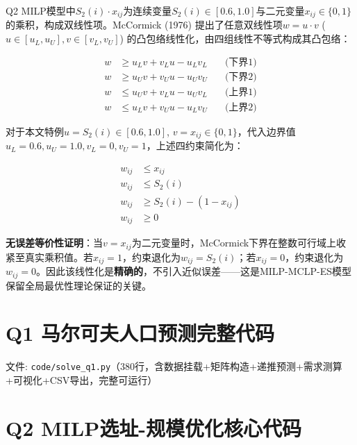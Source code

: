 Q2 MILP模型中$S_2(i)\cdot x_{ij}$为连续变量$S_2(i)\in[0.6,1.0]$与二元变量$x_{ij}\in\{0,1\}$的乘积，构成双线性项。McCormick (1976) 提出了任意双线性项$w = u\cdot v$ ($u\in[u_L,u_U], v\in[v_L,v_U]$) 的凸包络线性化，由四组线性不等式构成其凸包络：

\begin{equation}
\begin{aligned}
w &\ge u_L v + v_L u - u_L v_L \quad &\text{(下界1)} \\
w &\ge u_U v + v_U u - u_U v_U \quad &\text{(下界2)} \\
w &\le u_U v + v_L u - u_U v_L \quad &\text{(上界1)} \\
w &\le u_L v + v_U u - u_L v_U \quad &\text{(上界2)}
\end{aligned}
\end{equation}

对于本文特例$u=S_2(i)\in[0.6,1.0]$, $v=x_{ij}\in\{0,1\}$，代入边界值$u_L=0.6, u_U=1.0, v_L=0, v_U=1$，上述四约束简化为：

\begin{equation}
\boxed{
\begin{aligned}
w_{ij} &\le x_{ij} \\
w_{ij} &\le S_2(i) \\
w_{ij} &\ge S_2(i) - (1 - x_{ij}) \\
w_{ij} &\ge 0
\end{aligned}
}
\end{equation}

\textbf{无误差等价性证明}：当$v=x_{ij}$为二元变量时，McCormick下界在整数可行域上收紧至真实乘积值。若$x_{ij}=1$，约束退化为$w_{ij}=S_2(i)$；若$x_{ij}=0$，约束退化为$w_{ij}=0$。因此该线性化是\textbf{精确的}，不引入近似误差——这是MILP-MCLP-ES模型保留全局最优性理论保证的关键。

\section{Q1 马尔可夫人口预测完整代码}

{\small 文件: \texttt{code/solve\_q1.py}（380行，含数据挂载+矩阵构造+递推预测+需求测算+可视化+CSV导出，完整可运行）}



\section{Q2 MILP选址-规模优化核心代码}

